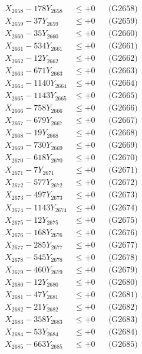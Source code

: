 \documentclass[a4paper,10pt]{article}
\begin{document}
{\begin{align}
X_{2658} - 178Y_{2658} &\leq +0 && \text{(G2658)} \\
X_{2659} - 37Y_{2659} &\leq +0 && \text{(G2659)} \\
X_{2660} - 35Y_{2660} &\leq +0 && \text{(G2660)} \\
\allowbreak
X_{2661} - 534Y_{2661} &\leq +0 && \text{(G2661)} \\
X_{2662} - 12Y_{2662} &\leq +0 && \text{(G2662)} \\
X_{2663} - 671Y_{2663} &\leq +0 && \text{(G2663)} \\
X_{2664} - 1140Y_{2664} &\leq +0 && \text{(G2664)} \\
X_{2665} - 1143Y_{2665} &\leq +0 && \text{(G2665)} \\
X_{2666} - 758Y_{2666} &\leq +0 && \text{(G2666)} \\
X_{2667} - 679Y_{2667} &\leq +0 && \text{(G2667)} \\
X_{2668} - 19Y_{2668} &\leq +0 && \text{(G2668)} \\
X_{2669} - 730Y_{2669} &\leq +0 && \text{(G2669)} \\
X_{2670} - 618Y_{2670} &\leq +0 && \text{(G2670)} \\
\allowbreak
X_{2671} - 7Y_{2671} &\leq +0 && \text{(G2671)} \\
X_{2672} - 577Y_{2672} &\leq +0 && \text{(G2672)} \\
X_{2673} - 497Y_{2673} &\leq +0 && \text{(G2673)} \\
X_{2674} - 1143Y_{2674} &\leq +0 && \text{(G2674)} \\
X_{2675} - 12Y_{2675} &\leq +0 && \text{(G2675)} \\
X_{2676} - 168Y_{2676} &\leq +0 && \text{(G2676)} \\
X_{2677} - 285Y_{2677} &\leq +0 && \text{(G2677)} \\
X_{2678} - 545Y_{2678} &\leq +0 && \text{(G2678)} \\
X_{2679} - 460Y_{2679} &\leq +0 && \text{(G2679)} \\
X_{2680} - 12Y_{2680} &\leq +0 && \text{(G2680)} \\
\allowbreak
X_{2681} - 47Y_{2681} &\leq +0 && \text{(G2681)} \\
X_{2682} - 21Y_{2682} &\leq +0 && \text{(G2682)} \\
X_{2683} - 358Y_{2683} &\leq +0 && \text{(G2683)} \\
X_{2684} - 53Y_{2684} &\leq +0 && \text{(G2684)} \\
X_{2685} - 663Y_{2685} &\leq +0 && \text{(G2685)} \\

\end{align}}
\end{document}
